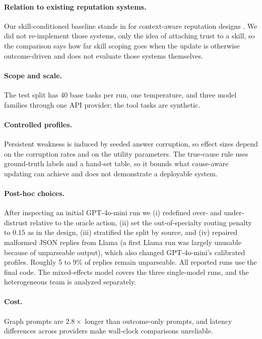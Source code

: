 \documentclass[letterpaper]{article}
\begin{document}
\paragraph{Relation to existing reputation systems.}
Our skill-conditioned baseline stands in for context-aware reputation designs \citep{xia2026conditional,chishti2026agentreputation}. We did not re-implement those systems, only the idea of attaching trust to a skill, so the comparison says how far skill scoping goes when the update is otherwise outcome-driven and does not evaluate those systems themselves.

\paragraph{Scope and scale.}
The test split has 40 base tasks per run, one temperature, and three model families through one API provider; the tool tasks are synthetic.

\paragraph{Controlled profiles.}
Persistent weakness is induced by seeded answer corruption, so effect sizes depend on the corruption rates and on the utility parameters. The true-cause rule uses ground-truth labels and a hand-set table, so it bounds what cause-aware updating can achieve and does not demonstrate a deployable system.

\paragraph{Post-hoc choices.}
After inspecting an initial GPT-4o-mini run we (i) redefined over- and under-distrust relative to the oracle action, (ii) set the out-of-specialty routing penalty to $0.15$ as in the design, (iii) stratified the split by source, and (iv) repaired malformed JSON replies from Llama (a first Llama run was largely unusable because of unparseable output), which also changed GPT-4o-mini's calibrated profiles. Roughly 5 to 9\% of replies remain unparseable. All reported runs use the final code. The mixed-effects model covers the three single-model runs, and the heterogeneous team is analyzed separately.

\paragraph{Cost.} Graph prompts are $2.8\times$ longer than outcome-only prompts, and latency differences across providers make wall-clock comparisons unreliable.
\end{document}

